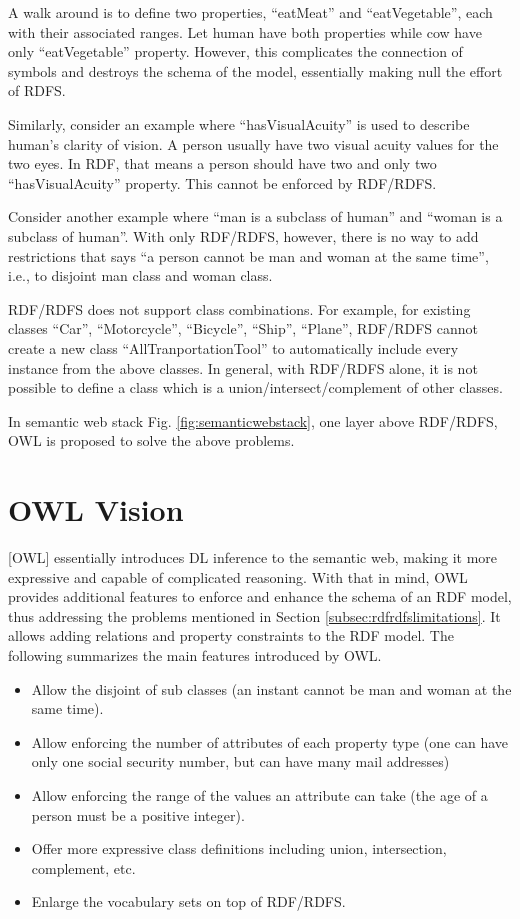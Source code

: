 A walk around is to define two properties, ``eatMeat'' and ``eatVegetable'', each with their associated ranges. Let human have both properties while cow have only ``eatVegetable'' property. However, this complicates the connection of symbols and destroys the schema of the model, essentially making null the effort of RDFS.

Similarly, consider an example where ``hasVisualAcuity'' is used to describe human's clarity of vision. A person usually have two visual acuity values for the two eyes. In RDF, that means a person should have two and only two ``hasVisualAcuity'' property. This cannot be enforced by RDF/RDFS.

Consider another example where ``man is a subclass of human'' and ``woman is a subclass of human''. With only RDF/RDFS, however, there is no way to add restrictions that says ``a person cannot be man and woman at the same time'', i.e., to disjoint man class and woman class.

RDF/RDFS does not support class combinations. For example, for existing classes ``Car'', ``Motorcycle'', ``Bicycle'', ``Ship'', ``Plane'', RDF/RDFS cannot create a new class ``AllTranportationTool'' to automatically include every instance from the above classes. In general, with RDF/RDFS alone, it is not possible to define a class which is a union/intersect/complement of other classes.

In semantic web stack Fig. \ref{fig:semanticwebstack}, one layer above RDF/RDFS, OWL is proposed to solve the above problems.

\section{OWL Vision}

[OWL] essentially introduces DL inference to the semantic web, making it more expressive and capable of complicated reasoning. With that in mind, OWL provides additional features to enforce and enhance the schema of an RDF model, thus addressing the problems mentioned in Section \ref{subsec:rdfrdfslimitations}. It allows adding relations and property constraints to the RDF model. The following summarizes the main features introduced by OWL.
\begin{itemize}
	\item Allow the disjoint of sub classes (an instant cannot be man and woman at the same time).
	\item Allow enforcing the number of attributes of each property type (one can have only one social security number, but can have many mail addresses)
	\item Allow enforcing the range of the values an attribute can take (the age of a person must be a positive integer).
	\item Offer more expressive class definitions including union, intersection, complement, etc.
	\item Enlarge the vocabulary sets on top of RDF/RDFS.
\end{itemize}

